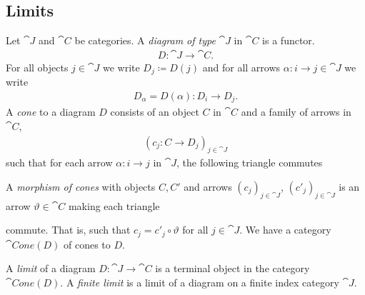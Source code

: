 \documentclass{article}
\begin{document}
\subsection{Limits}

\begin{definition}
    Let $\cat J$ and $\cat C$ be categories. A \emph{diagram of type} $\cat J$
    in $\cat C$ is a functor. 
    \begin{align*}
        D:\cat J \to \cat C.
    \end{align*}
    For all objects $j\in\cat J$ we write $D_j\coloneqq D(j)$ and for all arrows
    $\alpha:i\to j\in\cat J$ we write
    \begin{align*}
        D_\alpha = D(\alpha):D_i\to D_j.
    \end{align*}
    A \emph{cone} to a diagram $D$ consists of an object $C$ in $\cat C$ and
    a family of arrows in $\cat C$,
    \begin{align*}
        \left(c_j:C\to D_j\right)_{j\in\cat J}
    \end{align*}
    such that for each arrow $\alpha:i\to j$ in $\cat J$, 
    the following triangle commutes
    \begin{center}
    \end{center}
    A \emph{morphism of cones} with objects $C,C'$ and arrows
    $\left(c_j\right)_{j\in\cat J}$, $\left(c'_j\right)_{j\in\cat J}$
    is an arrow $\vartheta\in\cat C$ making each triangle
    \begin{center}
    \end{center}
    commute. That is, such that $c_j = c'_j \circ \vartheta$ for all $j\in\cat J$.
    We have a category $\cat{Cone}(D)$ of cones to $D$.
\end{definition}

\begin{definition}[Awodey p. 102]
    A \emph{limit} of a diagram $D:\cat J \to \cat C$ is a terminal object in the
    category $\cat{Cone}(D)$. A \emph{finite limit} is a limit of a diagram on
    a finite index category $\cat J$.
\end{definition} 
\end{document}
